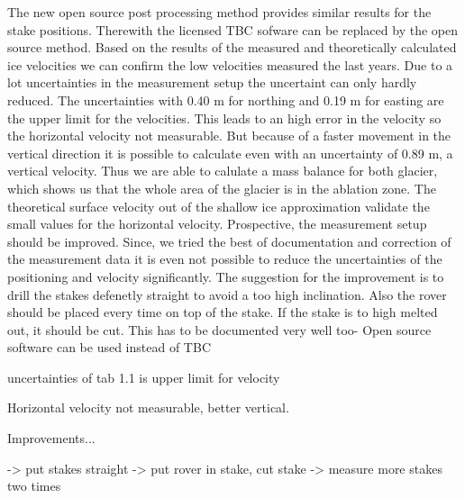 The new open source post processing method provides similar results for the stake positions.
Therewith the licensed TBC sofware can be replaced by the open source method.
Based on the results of the measured and theoretically calculated ice velocities we can confirm the low velocities measured the last years.
Due to a lot uncertainties in the measurement setup the uncertaint can only hardly reduced.
The uncertainties with 0.40 m for northing and 0.19 m for easting are the upper limit for the velocities. 
This leads to an high error in the velocity so the horizontal velocity not measurable.
But because of a faster movement in the vertical direction it is possible to calculate even with an uncertainty of 0.89 m, a vertical velocity.
Thus we are able to calulate a mass balance for both glacier, which shows us that the whole area of the glacier is in the ablation zone.
The theoretical surface velocity out of the shallow ice approximation validate the small values for the horizontal velocity.
Prospective, the measurement setup should be improved. 
Since, we tried the best of documentation and correction of the measurement data it is even not possible to reduce the uncertainties of the positioning and velocity significantly. 
The suggestion for the improvement is to drill the stakes defenetly straight to avoid a too high inclination.
Also the rover should be placed every time on top of the stake.
If the stake is to high melted out, it should be cut. 
This has to be documented very well too- 
Open source software can be used instead of TBC



uncertainties of tab 1.1 is upper limit for velocity

Horizontal velocity not measurable, better vertical.



Improvements...

-> put stakes straight
-> put rover in stake, cut stake
-> measure more stakes two times

